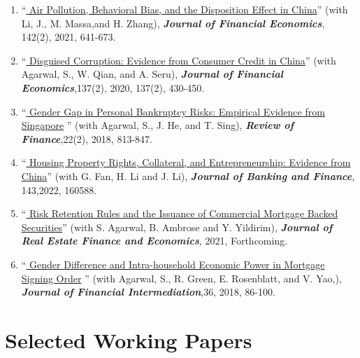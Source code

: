 \documentclass[margin,line]{res}
\begin{document}
\begin{resume}
\begin{enumerate}
\item %
``\href{https://www.sciencedirect.com/science/article/abs/pii/S0304405X19302223}{\color{black} Air Pollution, Behavioral Bias, and the Disposition Effect in China}'' (with Li, J., M. Massa,and H. Zhang), \textbf{\emph{Journal of Financial Economics}}, 142(2), 2021, 641-673.
\vspace*{0.2cm}	
\item %
``\href{https://www.sciencedirect.com/science/article/abs/pii/S0304405X20300611}{\color{black} Disguised Corruption: Evidence from Consumer Credit in China}'' (with Agarwal, S., W. Qian, and A. Seru), \textbf{\emph{Journal of Financial Economics}},137(2), 2020, 137(2), 430-450.	
\vspace*{0.2cm}	
\item %
 ``\href{https://academic.oup.com/rof/article-abstract/22/2/813/2629221}{\color{black} Gender Gap in Personal Bankruptcy Risks: Empirical Evidence from Singapore} '' (with Agarwal, S., J. He, and T. Sing), \textbf{\emph{Review of Finance}},22(2), 2018, 813-847.
\vspace*{0.2cm}
\item %
``\href{https://www.sciencedirect.com/science/article/abs/pii/S0378426622001844}{\color{black} Housing Property Rights, Collateral, and Entrepreneurship: Evidence from China}'' (with G. Fan, H. Li and J. Li), \textbf{\emph{Journal of Banking and Finance}}, 143,2022, 160588.
\vspace*{0.2cm}
\item %
``\href{https://link.springer.com/article/10.1007/s11146-021-09837-1}{\color{black} Risk Retention Rules and the Issuance of Commercial Mortgage Backed Securities}'' (with S. Agarwal, B. Ambrose and Y. Yildirim), \textbf{\emph{Journal of Real Estate Finance and Economics}}, 2021, Forthcoming.
\vspace*{0.2cm}
\item ``\href{https://www.sciencedirect.com/science/article/abs/pii/S104295731830007X}{\color{black} Gender Difference and Intra-household Economic Power in Mortgage Signing Order} '' (with Agarwal, S., R. Green, E. Rosenblatt, and V. Yao,), \textbf{\emph{Journal of Financial Intermediation}},36, 2018, 86-100.	
\end{enumerate}

\section{\sc Selected Working Papers}
\begin{enumerate}


\end{enumerate}
\end{resume}
\end{document}
